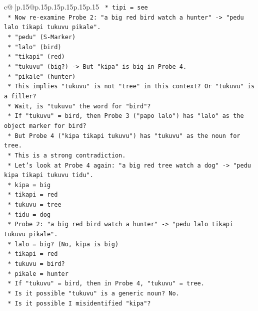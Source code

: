 \documentclass{article}
\begin{document}
{\begin{supertabular}{c@{$\;$}|p{.15\linewidth}@{}p{.15\linewidth}p{.15\linewidth}p{.15\linewidth}p{.15\linewidth}p{.15\linewidth}}
{{{\texttt{            *   tipi = see} \\
\texttt{        *   Now re{-}examine Probe 2: "a big red bird watch a hunter" {-}> "pedu lalo tikapi tukuvu pikale".} \\
\texttt{            *   "pedu" (S{-}Marker)} \\
\texttt{            *   "lalo" (bird)} \\
\texttt{            *   "tikapi" (red)} \\
\texttt{            *   "tukuvu" (big?) {-}> But "kipa" is big in Probe 4.} \\
\texttt{            *   "pikale" (hunter)} \\
\texttt{            *   This implies "tukuvu" is not "tree" in this context? Or "tukuvu" is a filler?} \\
\texttt{            *   Wait, is "tukuvu" the word for "bird"?} \\
\texttt{            *   If "tukuvu" = bird, then Probe 3 ("papo lalo") has "lalo" as the object marker for bird?} \\
\texttt{            *   But Probe 4 ("kipa tikapi tukuvu") has "tukuvu" as the noun for tree.} \\
\texttt{            *   This is a strong contradiction.} \\
\texttt{            *   Let's look at Probe 4 again: "a big red tree watch a dog" {-}> "pedu kipa tikapi tukuvu tidu".} \\
\texttt{                *   kipa = big} \\
\texttt{                *   tikapi = red} \\
\texttt{                *   tukuvu = tree} \\
\texttt{                *   tidu = dog} \\
\texttt{            *   Probe 2: "a big red bird watch a hunter" {-}> "pedu lalo tikapi tukuvu pikale".} \\
\texttt{                *   lalo = big? (No, kipa is big)} \\
\texttt{                *   tikapi = red} \\
\texttt{                *   tukuvu = bird?} \\
\texttt{                *   pikale = hunter} \\
\texttt{            *   If "tukuvu" = bird, then in Probe 4, "tukuvu" = tree.} \\
\texttt{            *   Is it possible "tukuvu" is a generic noun? No.} \\
\texttt{            *   Is it possible I misidentified "kipa"?} \\
}}}
\end{supertabular}}
\end{document}
